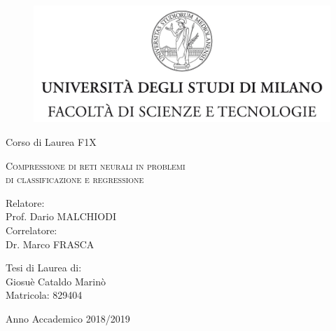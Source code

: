 \documentclass[11pt,a4paper,twoside,
openright]{book}
\begin{document}
\begin{titlepage}
	
	\begin{figure}
		\centering
		\includegraphics[width=424pt]{tesiSCIENZE_TECNOLOGIE.jpg}%
		\vspace{0.5 cm}
	\end{figure}
	

\begin{center}
{\LARGE Corso di Laurea F1X}
\end{center}

\begin{center}
\vspace{3 cm}
{\Large \textsc{Compressione di reti neurali in problemi \\ di classificazione e regressione} }
\end{center}
\par
  \vspace{3 cm}
  
  \begin{flushleft}
  		 Relatore:\\Prof. Dario MALCHIODI\\
		 
  		 \noindent Correlatore:\\Dr. Marco FRASCA
  \end{flushleft}
  \vspace{1 cm}
  \begin{flushright}
  	Tesi di Laurea di:\\ Giosuè Cataldo Marinò\\ Matricola: 829404
  \end{flushright}
    	  
\vfill
\begin{center}
	{\large Anno Accademico 2018/2019}
\end{center}

\end{titlepage}
\end{document}
